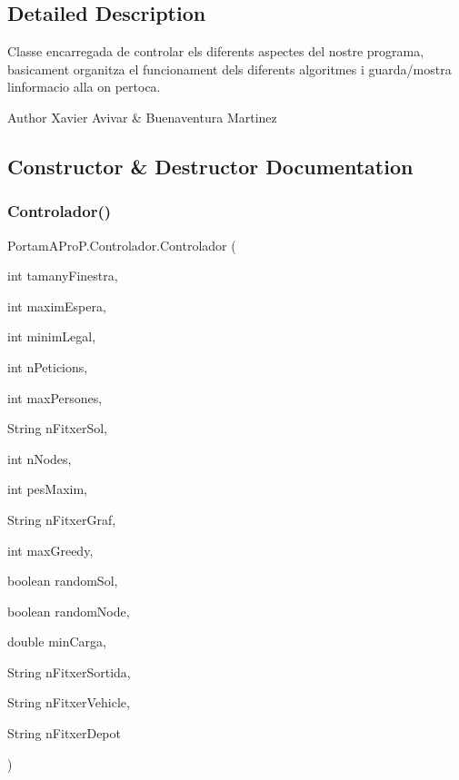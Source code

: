 \subsection{Detailed Description}
Classe encarregada de controlar els diferents aspectes del nostre programa, basicament organitza el funcionament dels diferents algoritmes i guarda/mostra l\textquotesingle{}informacio alla on pertoca. 

\begin{DoxyAuthor}{Author}
Xavier Avivar \& Buenaventura Martinez 
\end{DoxyAuthor}


\subsection{Constructor \& Destructor Documentation}
\mbox{\label{class_portam_a_pro_p_1_1_controlador_a262bc14ad6aa78a5d311f093227b4d9c}} 
\subsubsection{\texorpdfstring{Controlador()}{Controlador()}}
{\footnotesize\ttfamily Portam\+A\+Pro\+P.\+Controlador.\+Controlador (\begin{DoxyParamCaption}\item[{int}]{tamany\+Finestra,  }\item[{int}]{maxim\+Espera,  }\item[{int}]{minim\+Legal,  }\item[{int}]{n\+Peticions,  }\item[{int}]{max\+Persones,  }\item[{String}]{n\+Fitxer\+Sol,  }\item[{int}]{n\+Nodes,  }\item[{int}]{pes\+Maxim,  }\item[{String}]{n\+Fitxer\+Graf,  }\item[{int}]{max\+Greedy,  }\item[{boolean}]{random\+Sol,  }\item[{boolean}]{random\+Node,  }\item[{double}]{min\+Carga,  }\item[{String}]{n\+Fitxer\+Sortida,  }\item[{String}]{n\+Fitxer\+Vehicle,  }\item[{String}]{n\+Fitxer\+Depot }\end{DoxyParamCaption})}




